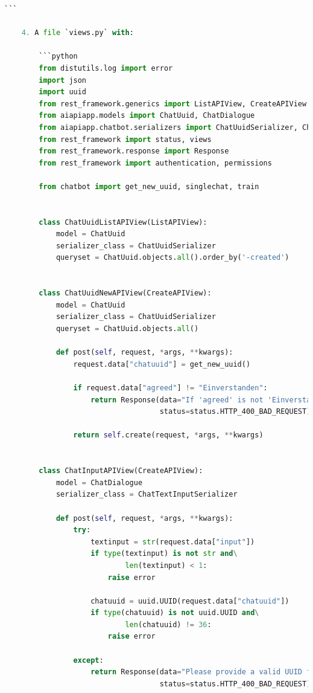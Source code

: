 \documentclass[12pt,oneside,titlepage,listof=totoc,bibliography=totoc]{scrartcl}
\begin{document}
\begin{appendices}
\begin{lstlisting}[language=python,numbers=none]
        ```

    4. A file `views.py` with:

        ```python
        from distutils.log import error
        import json
        import uuid
        from rest_framework.generics import ListAPIView, CreateAPIView
        from aiapiapp.models import ChatUuid, ChatDialogue
        from aiapiapp.chatbot.serializers import ChatUuidSerializer, ChatTextInputSerializer
        from rest_framework import status, views
        from rest_framework.response import Response
        from rest_framework import authentication, permissions

        from chatbot import get_new_uuid, singlechat, train


        class ChatUuidListAPIView(ListAPIView):
            model = ChatUuid
            serializer_class = ChatUuidSerializer
            queryset = ChatUuid.objects.all().order_by('-created')


        class ChatUuidNewAPIView(CreateAPIView):
            model = ChatUuid
            serializer_class = ChatUuidSerializer
            queryset = ChatUuid.objects.all()

            def post(self, request, *args, **kwargs):
                request.data["chatuuid"] = get_new_uuid()

                if request.data["agreed"] != "Einverstanden":
                    return Response(data="If 'agreed' is not 'Einverstanden' you can not use the services.",
                                    status=status.HTTP_400_BAD_REQUEST)

                return self.create(request, *args, **kwargs)


        class ChatInputAPIView(CreateAPIView):
            model = ChatDialogue
            serializer_class = ChatTextInputSerializer

            def post(self, request, *args, **kwargs):
                try:
                    textinput = str(request.data["input"])
                    if type(textinput) is not str and\
                            len(textinput) < 1:
                        raise error

                    chatuuid = uuid.UUID(request.data["chatuuid"])
                    if type(chatuuid) is not uuid.UUID and\
                            len(chatuuid) != 36:
                        raise error

                except:
                    return Response(data="Please provide a valid UUID for the conversation and a input text to answer to.",
                                    status=status.HTTP_400_BAD_REQUEST)


\end{lstlisting}
\end{appendices}
\end{document}
